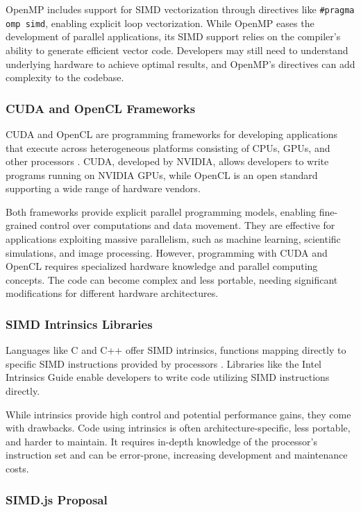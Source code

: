 \documentclass[12pt,a4paper]{article}
\begin{document}
OpenMP includes support for SIMD vectorization through directives like \texttt{\#pragma omp simd}, enabling explicit loop vectorization. While OpenMP eases the development of parallel applications, its SIMD support relies on the compiler's ability to generate efficient vector code. Developers may still need to understand underlying hardware to achieve optimal results, and OpenMP's directives can add complexity to the codebase.

\subsubsection{CUDA and OpenCL Frameworks}

CUDA and OpenCL are programming frameworks for developing applications that execute across heterogeneous platforms consisting of CPUs, GPUs, and other processors \citep{Nickolls2008GPU, Stone2010OpenCL}. CUDA, developed by NVIDIA, allows developers to write programs running on NVIDIA GPUs, while OpenCL is an open standard supporting a wide range of hardware vendors.

Both frameworks provide explicit parallel programming models, enabling fine-grained control over computations and data movement. They are effective for applications exploiting massive parallelism, such as machine learning, scientific simulations, and image processing. However, programming with CUDA and OpenCL requires specialized hardware knowledge and parallel computing concepts. The code can become complex and less portable, needing significant modifications for different hardware architectures.

\subsubsection{SIMD Intrinsics Libraries}

Languages like C and C++ offer SIMD intrinsics, functions mapping directly to specific SIMD instructions provided by processors \citep{Intel2023Intrinsics}. Libraries like the Intel Intrinsics Guide enable developers to write code utilizing SIMD instructions directly.

While intrinsics provide high control and potential performance gains, they come with drawbacks. Code using intrinsics is often architecture-specific, less portable, and harder to maintain. It requires in-depth knowledge of the processor's instruction set and can be error-prone, increasing development and maintenance costs.

\subsubsection{SIMD.js Proposal}
\end{document}
